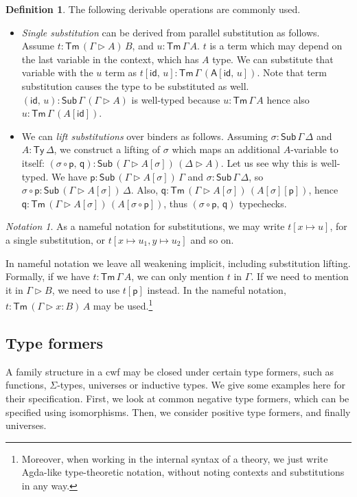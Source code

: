 \documentclass[12pt,a4paper,twoside,openany]{book}
\theoremstyle{remark}
\newtheorem{notation}{Notation}
\theoremstyle{definition}
\newtheorem{mydefinition}{Definition}
\newcommand{\id}{\mathsf{id}}
\newcommand{\Sub}{\mathsf{Sub}}
\newcommand{\Tm}{\mathsf{Tm}}
\newcommand{\Ty}{\mathsf{Ty}}
\newcommand{\ext}{\triangleright}
\newcommand{\p}{\mathsf{p}}
\newcommand{\q}{\mathsf{q}}
\newcommand{\A}{\mathsf{A}}
\begin{document}
\begin{mydefinition} The following derivable operations are commonly used.
  \begin{itemize}
    \item \emph{Single substitution} can be derived from parallel substitution
      as follows. Assume $t : \Tm\,(\Gamma\ext A)\,B$, and $u :
      \Tm\,\Gamma\,A$. $t$ is a term which may depend on the last variable in
      the context, which has $A$ type. We can substitute that variable with the
      $u$ term as $t[\id,\,u] : \Tm\,\Gamma\,(\A[\id,\,u])$. Note that term
      substitution causes the type to be substituted as well. $(\id,\,u) :
      \Sub\,\Gamma\,(\Gamma\ext A)$ is well-typed because $u : \Tm\,\Gamma\,A$
      hence also $u : \Tm\,\Gamma\,(A[\id])$.

    \item We can \emph{lift substitutions} over binders as follows. Assuming
      $\sigma : \Sub\,\Gamma\,\Delta$ and $A : \Ty\,\Delta$, we construct a
      lifting of $\sigma$ which maps an additional $A$-variable to itself:
      $(\sigma\circ\p,\,\q) : \Sub\,(\Gamma\ext A[\sigma])\,(\Delta \ext A)$.
      Let us see why this is well-typed. We have $\p : \Sub\,(\Gamma\ext
      A[\sigma])\,\Gamma$ and $\sigma : \Sub\,\Gamma\,\Delta$, so $\sigma \circ
      \p : \Sub\,(\Gamma\ext A[\sigma])\,\Delta$. Also, $\q : \Tm\,(\Gamma\ext
      A[\sigma])\,(A[\sigma][\p])$, hence $\q : \Tm\,(\Gamma\ext
      A[\sigma])\,(A[\sigma \circ \p])$, thus $(\sigma\circ \p,\,\q)$
      typechecks.
  \end{itemize}
\end{mydefinition}

\begin{notation}

As a nameful notation for substitutions, we may write $t[x \mapsto u]$, for
a single substitution, or $t[x \mapsto u_1, y \mapsto u_2]$ and so on.

In nameful notation we leave all weakening implicit, including substitution
lifting. Formally, if we have $t : \Tm\,\Gamma\,A$, we can only mention $t$ in
$\Gamma$. If we need to mention it in $\Gamma \ext B$, we need to use $t[\p]$
instead. In the nameful notation, $t : \Tm\,(\Gamma\ext x : B)\,A$ may be
used.\footnote{Moreover, when working in the internal syntax of a theory, we
just write Agda-like type-theoretic notation, without noting contexts and
substitutions in any way.}
\end{notation}

\subsection{Type formers}
A family structure in a cwf may be closed under certain type formers, such as
functions, $\Sigma$-types, universes or inductive types. We give some examples
here for their specification. First, we look at common negative type formers,
which can be specified using isomorphisms. Then, we consider positive type
formers, and finally universes.
\end{document}
